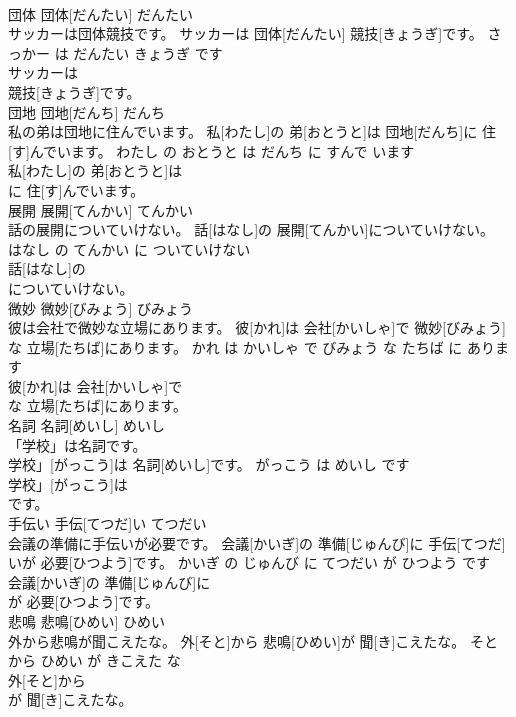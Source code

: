\documentclass[8pt]{extreport}
\begin{document}
\begin{CJK}{UTF8}{min}
\\	団体	団体[だんたい]	だんたい	
\\	サッカーは団体競技です。	サッカーは 団体[だんたい] 競技[きょうぎ]です。	さっかー は だんたい きょうぎ です	
\\	サッカーは
\\	競技[きょうぎ]です。			
\\	団地	団地[だんち]	だんち	
\\	私の弟は団地に住んでいます。	私[わたし]の 弟[おとうと]は 団地[だんち]に 住[す]んでいます。	わたし の おとうと は だんち に すんで います	
\\	私[わたし]の 弟[おとうと]は
\\	に 住[す]んでいます。			
\\	展開	展開[てんかい]	てんかい	
\\	話の展開についていけない。	話[はなし]の 展開[てんかい]についていけない。	はなし の てんかい に ついていけない	
\\	話[はなし]の
\\	についていけない。			
\\	微妙	微妙[びみょう]	びみょう	
\\	彼は会社で微妙な立場にあります。	彼[かれ]は 会社[かいしゃ]で 微妙[びみょう]な 立場[たちば]にあります。	かれ は かいしゃ で びみょう な たちば に あります	
\\	彼[かれ]は 会社[かいしゃ]で
\\	な 立場[たちば]にあります。			
\\	名詞	名詞[めいし]	めいし	
\\	「学校」は名詞です。	
\\	学校」[がっこう]は 名詞[めいし]です。	がっこう は めいし です	
\\	学校」[がっこう]は
\\	です。			
\\	手伝い	手伝[てつだ]い	てつだい	
\\	会議の準備に手伝いが必要です。	会議[かいぎ]の 準備[じゅんび]に 手伝[てつだ]いが 必要[ひつよう]です。	かいぎ の じゅんび に てつだい が ひつよう です	
\\	会議[かいぎ]の 準備[じゅんび]に
\\	が 必要[ひつよう]です。			
\\	悲鳴	悲鳴[ひめい]	ひめい	
\\	外から悲鳴が聞こえたな。	外[そと]から 悲鳴[ひめい]が 聞[き]こえたな。	そと から ひめい が きこえた な	
\\	外[そと]から
\\	が 聞[き]こえたな。			

\end{CJK}
\end{document}
